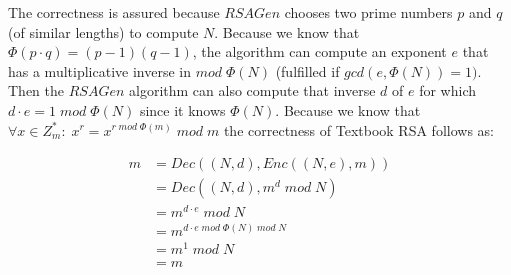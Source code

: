 The correctness is assured because $RSAGen$ chooses two prime numbers $p$ and $q$ (of similar lengths) to compute $N$.
Because we know that $\Phi(p \cdot q) = (p-1)(q-1)$, the algorithm can compute an exponent $e$ that has a multiplicative inverse in $mod\; \Phi(N)$ (fulfilled if $gcd(e, \Phi(N)) = 1)$.
Then the $RSAGen$ algorithm can also compute that inverse $d$ of $e$ for which $d \cdot e = 1 \;mod\; \Phi(N)$ since it knows $\Phi(N)$.
Because we know that $\forall x \in Z_m^* :\; x^r = x^{r \;mod\; \Phi(m)} \;mod\; m $ the correctness of Textbook RSA follows as:

\begin{align*}
    m & = Dec((N,d), Enc((N,e), m))         \\
      & = Dec((N,d), m^d \;mod\; N)         \\
      & = m^{d \cdot e} \;mod\; N                 \\
      & = m^{d \cdot e \;mod\; \Phi(N) \;mod\; N} \\
      & = m^1 \;mod\; N                     \\
      & = m
\end{align*}

